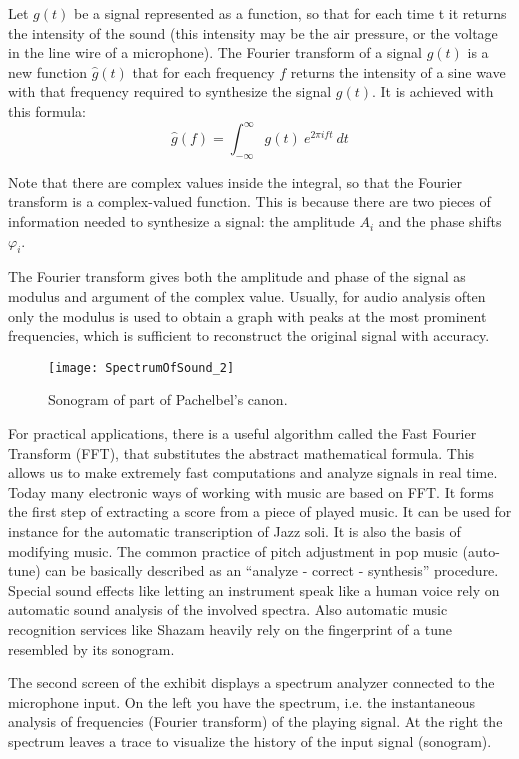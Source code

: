Let $g(t)$ be a signal represented as a function, so that for each time t it returns the intensity of the sound (this intensity may be the air pressure, or the voltage in the line wire of a microphone). The Fourier transform of a signal $g(t)$ is a new function $\hat g(t)$ that for each frequency $f$ returns the intensity of a sine wave with that frequency required to synthesize the signal $g(t)$. It is achieved with this formula:
$$\hat g(f) = \int_{-\infty}^{\infty} g(t)\ e^{2\pi i f t } \ dt$$

Note that there are complex values inside the integral, so that the Fourier transform is a complex-valued function. This is because there are two pieces of information needed to synthesize a signal: the amplitude $A_i$ and the phase shifts $\varphi_i$. 

The Fourier transform gives both the amplitude and phase of the signal as modulus and argument of the complex value. Usually, for audio analysis often only the modulus is used to obtain a graph with peaks at the most prominent frequencies, which is sufficient to reconstruct the original signal with accuracy.

\begin{wrapfigure}{r}{0.45\textwidth}
\centering
\texttt{[image: SpectrumOfSound\_2]}
\caption*{Sonogram of part of Pachelbel's canon.}
\end{wrapfigure}

For practical applications, there is a useful algorithm called the Fast Fourier Transform (FFT), that substitutes the abstract mathematical formula. This allows us to make extremely fast computations and analyze signals in real time. Today many electronic ways of working with music are based on FFT. It forms the first step of extracting a score from a piece of played music. It can be used for instance for the automatic transcription of Jazz soli. It is also the basis of modifying music. The common practice of pitch adjustment in pop music (auto-tune) can be basically described as an ``analyze - correct - synthesis'' procedure. Special sound effects like letting an instrument speak like a human voice rely on automatic sound analysis of the involved spectra. Also automatic music recognition services like Shazam heavily rely on the fingerprint of a tune resembled by its sonogram.

The second screen of the exhibit displays a spectrum analyzer connected to the microphone input. On the left you have the spectrum, i.e. the instantaneous analysis of frequencies (Fourier transform) of the playing signal. At the right the spectrum leaves a trace to visualize the history of the input signal (sonogram). 

